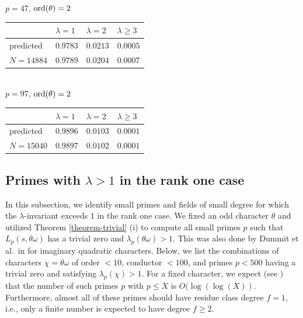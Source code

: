\documentclass[pdflatex,sn-mathphys-num]{sn-jnl}%
\theoremstyle{plain}
\theoremstyle{definition}
\theoremstyle{remark}
\numberwithin{equation}{section}
\newcommand{\ord}{\text{\rm ord}}
\begin{document}
\noindent $p=47$, $\ord(\theta)=2$\\
\begin{tabular}{|l|l|l|l|} \hline
 & $\lambda=1$ & $\lambda=2$ & $\lambda \geq 3$ \\ \hline
predicted & $0.9783$ & $0.0213$ & $0.0005$ \\ \hline
$N=14884$ & $0.9789$ & $0.0204$ & $0.0007$ \\ \hline
\end{tabular}\\

\noindent $p=97$, $\ord(\theta)=2$\\
\begin{tabular}{|l|l|l|l|} \hline
 & $\lambda=1$ & $\lambda=2$ & $\lambda \geq 3$ \\ \hline
predicted & $0.9896$ & $0.0103$ & $0.0001$ \\ \hline
$N=15040$ & $0.9897$ & $0.0102$ & $0.0001$  \\ \hline
\end{tabular}



\subsection{Primes with $\lambda>1$ in the rank one case}
In this subsection, we identify small primes and fields of small degree for which the $\lambda$-invariant exceeds $1$ in the rank one case.
We fixed an odd character $\theta$ and utilized Theorem \ref{theorem-trivial} (i) to compute all small primes $p$ such that  $L_p(s,\theta \omega)$ has a trivial zero and $\lambda_p(\theta \omega)>1$. This was also done by Dummit et al.\ in \cite{Du} for imaginary quadratic characters. 
Below, we list the combinations of characters $\chi = \theta \omega$ of order $<10$, conductor $<100$, and primes $p<500$ having a trivial zero and satisfying $\lambda_p(\chi)>1$. For a fixed character, we expect (see \cite{Du, DeKn}) that the number of such primes $p$ with $p \leq X$ is $O(\log(\log(X))$. Furthermore, almost all of these primes should have residue class degree $f=1$, i.e.,  only a finite number is expected to have degree $f \geq 2$. \\
\end{document}
